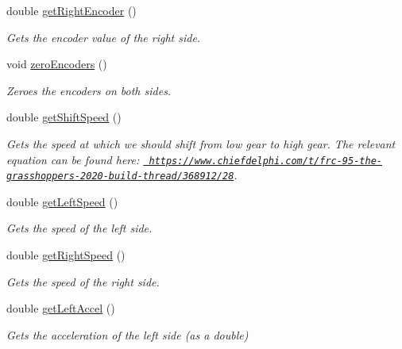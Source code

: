 \begin{DoxyCompactItemize}
double \mbox{\hyperlink{classfrc_1_1robot_1_1subsystems_1_1_base_a86a18d2879f4d03144ff8f40a5fec8b3}{get\+Right\+Encoder}} ()
\begin{DoxyCompactList}\small\item\em Gets the encoder value of the right side. \end{DoxyCompactList}\item 
\mbox{\label{classfrc_1_1robot_1_1subsystems_1_1_base_a3086df67c856d2135fdee1077cab1b50}} 
void \mbox{\hyperlink{classfrc_1_1robot_1_1subsystems_1_1_base_a3086df67c856d2135fdee1077cab1b50}{zero\+Encoders}} ()
\begin{DoxyCompactList}\small\item\em Zeroes the encoders on both sides. \end{DoxyCompactList}\item 
double \mbox{\hyperlink{classfrc_1_1robot_1_1subsystems_1_1_base_a7bbf51639ef6ea065c1ef065d1e9520b}{get\+Shift\+Speed}} ()
\begin{DoxyCompactList}\small\item\em Gets the speed at which we should shift from low gear to high gear. The relevant equation can be found here\+: \href{https://www.chiefdelphi.com/t/frc-95-the-grasshoppers-2020-build-thread/368912/28}{\texttt{ https\+://www.\+chiefdelphi.\+com/t/frc-\/95-\/the-\/grasshoppers-\/2020-\/build-\/thread/368912/28}}. \end{DoxyCompactList}\item 
double \mbox{\hyperlink{classfrc_1_1robot_1_1subsystems_1_1_base_af8159ba0759e6c3c0056445d481223da}{get\+Left\+Speed}} ()
\begin{DoxyCompactList}\small\item\em Gets the speed of the left side. \end{DoxyCompactList}\item 
double \mbox{\hyperlink{classfrc_1_1robot_1_1subsystems_1_1_base_aff145d6bf9d8854b3d4fe312b40344d8}{get\+Right\+Speed}} ()
\begin{DoxyCompactList}\small\item\em Gets the speed of the right side. \end{DoxyCompactList}\item 
double \mbox{\hyperlink{classfrc_1_1robot_1_1subsystems_1_1_base_a7d0b5e6419c7da9741f86807768f77fe}{get\+Left\+Accel}} ()
\begin{DoxyCompactList}\small\item\em Gets the acceleration of the left side (as a double) \end{DoxyCompactList}\item 

\end{DoxyCompactItemize}
